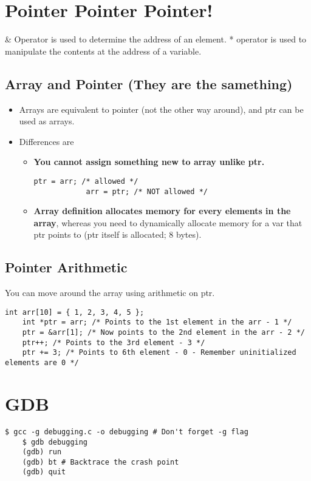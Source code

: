 \documentclass{article}
\begin{document}
\section{Pointer Pointer Pointer!}
\& Operator is used to determine the address of an element. * operator is used to manipulate the contents at the address of a variable.

\subsection{Array and Pointer (They are the samething)}
\begin{itemize}
    \item Arrays are equivalent to pointer (not the other way around), and ptr can be used as arrays.
    \item Differences are
    \begin{itemize}
        \item \textbf{You cannot assign something new to array unlike ptr.}
        \begin{lstlisting}[style=CStyle]
            ptr = arr; /* allowed */
            arr = ptr; /* NOT allowed */
        \end{lstlisting}
        \item \textbf{Array definition allocates memory for every elements in the array}, whereas you need to dynamically allocate memory for a var that ptr points to (ptr itself is allocated; 8 bytes).
    \end{itemize}
\end{itemize}

\subsection{Pointer Arithmetic}
You can move around the array using arithmetic on ptr.
\begin{lstlisting}[style=CStyle]
    int arr[10] = { 1, 2, 3, 4, 5 };
    int *ptr = arr; /* Points to the 1st element in the arr - 1 */
    ptr = &arr[1]; /* Now points to the 2nd element in the arr - 2 */
    ptr++; /* Points to the 3rd element - 3 */
    ptr += 3; /* Points to 6th element - 0 - Remember uninitialized elements are 0 */
\end{lstlisting}

\section{GDB}
\begin{lstlisting}[style=BashStyle]
    $ gcc -g debugging.c -o debugging # Don't forget -g flag
    $ gdb debugging
    (gdb) run
    (gdb) bt # Backtrace the crash point
    (gdb) quit
\end{lstlisting}
\end{document}
